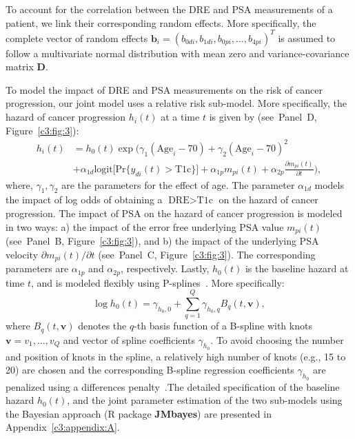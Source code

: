 To account for the correlation between the DRE and PSA measurements of a patient, we link their corresponding random effects. More specifically, the complete vector of random effects ${\boldsymbol{b}_i = (b_{0di}, b_{1di}, b_{0pi}, \ldots, b_{4pi})^T}$ is assumed to follow a multivariate normal distribution with mean zero and variance-covariance matrix $\boldsymbol{D}$.

To model the impact of DRE and PSA measurements on the risk of cancer progression, our joint model uses a relative risk sub-model. More specifically, the hazard of cancer progression $h_i(t)$ at a time $t$ is given by (see~Panel~D, Figure~\ref{c3:fig:3}):
\begin{equation}
\label{c3:eq:rel_risk_model}
\begin{split}
    h_i(t) &= h_0(t) \exp\Big(\gamma_1 (\mbox{Age}_i-70) + \gamma_2 (\mbox{Age}_i-70)^2\\
    &+\alpha_{1d} \mbox{logit} \big[\mbox{Pr}\{y_{di}(t) > \mbox{T1c}\}\big] + \alpha_{1p} m_{pi}(t) + \alpha_{2p} \frac{\partial m_{pi}(t)}{\partial {t}}\Big),
    \end{split}
\end{equation}
where, $\gamma_1, \gamma_2$ are the parameters for the effect of age. The parameter $\alpha_{1d}$ models the impact of log odds of obtaining a $\mbox{DRE} > \mbox{T1c}$ on the hazard of cancer progression. The impact of PSA on the hazard of cancer progression is modeled in two ways: a) the impact of the error free underlying PSA value $m_{pi}(t)$ (see~Panel~B, Figure~\ref{c3:fig:3}), and b) the impact of the underlying PSA velocity $\partial m_{pi}(t)/\partial {t}$ (see~Panel~C, Figure~\ref{c3:fig:3}). The corresponding parameters are $\alpha_{1p}$ and $\alpha_{2p}$, respectively. Lastly, $h_0(t)$ is the baseline hazard at time $t$, and is modeled flexibly using P-splines~\citep{eilers1996flexible}. More specifically:
\begin{equation*}
\log{h_0(t)} = \gamma_{h_0,0} + \sum_{q=1}^Q \gamma_{h_0,q} B_q(t, \boldsymbol{v}),
\end{equation*}
where $B_q(t, \boldsymbol{v})$ denotes the $q$-th basis function of a B-spline with knots $\boldsymbol{v} = v_1, \ldots, v_Q$ and vector of spline coefficients $\gamma_{h_0}$. To avoid choosing the number and position of knots in the spline, a relatively high number of knots (e.g., 15 to 20) are chosen and the corresponding B-spline regression coefficients $\gamma_{h_0}$ are penalized using a differences penalty~\citep{eilers1996flexible}.The detailed specification of the baseline hazard $h_0(t)$, and the joint parameter estimation of the two sub-models using the Bayesian approach (R package \textbf{JMbayes}) are presented in Appendix~\ref{c3:appendix:A}.

